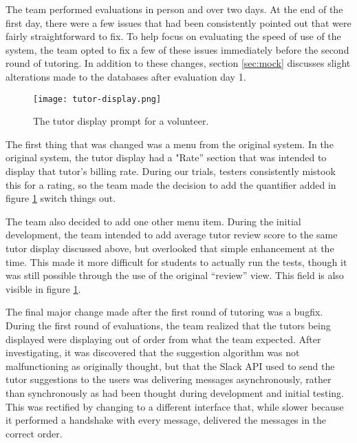 The team performed evaluations in person and over two days.  At the end of
the first day, there were a few issues that had been consistently pointed out
that were fairly straightforward to fix.  To help focus on evaluating the speed
of use of the system, the team opted to fix a few of these issues immediately
before the second round of tutoring. In addition to these changes, section \ref{sec:mock}
discusses slight alterations made to the databases after evaluation day 1.

\begin{figure}
  \caption{The tutor display prompt for a volunteer.} \label{fig:tutor_display}
  \centering
    \texttt{[image: tutor-display.png]}
\end{figure}

The first thing that was changed was a menu from the original system.  In the
original system, the tutor display had a "Rate'' section that was intended to
display that tutor's billing rate.  During our trials, testers consistently
mistook this for a rating, so the team made the decision to add the quantifier
added in figure \ref{fig:tutor_display} switch things out.

The team also decided to add one other menu item. During the initial
development, the team intended to add average tutor review score to the same
tutor display discussed above, but overlooked that simple enhancement at the
time.  This made it more difficult for students to actually run the tests,
though it was still possible through the use of the original ``review'' view.
This field is also visible in figure \ref{fig:tutor_display}.

The final major change made after the first round of tutoring was a bugfix.
During the first round of evaluations, the team realized that the tutors being
displayed were displaying out of order from what the team expected.  After
investigating, it was discovered that the suggestion algorithm was not
malfunctioning as originally thought, but that the Slack API used to send the
tutor suggestions to the users was delivering messages asynchronously, rather
than synchronously as had been thought during development and initial testing.
This was rectified by changing to a different interface that, while slower
because it performed a handshake with every message, delivered the messages in
the correct order.  

